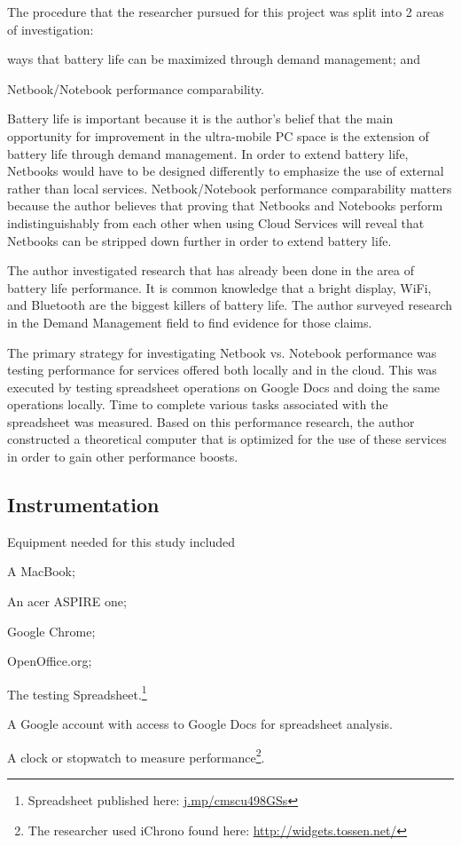 The procedure that the researcher pursued for this project was split into 2 areas
of investigation:
\begin{inparaenum}[(1)]
\item ways that battery life can be maximized through demand management; and
\item Netbook/Notebook performance comparability.
\end{inparaenum}
Battery life is important because it is the author's belief that the main
opportunity for improvement in the ultra-mobile PC space is the extension of
battery life through demand management.  In order to extend battery life,
Netbooks would have to be designed differently to emphasize the use of external
rather than local services.  Netbook/Notebook performance comparability matters
because the author believes that proving that Netbooks and Notebooks perform
indistinguishably from each other when using Cloud Services will reveal that
Netbooks can be stripped down further in order to extend battery life.

The author investigated research that has already been done in the area of
battery life performance.  It is common knowledge that a bright display, WiFi,
and Bluetooth are the biggest killers of battery life.  The author surveyed
research in the Demand Management field to find evidence for those claims.

The primary strategy for investigating Netbook vs. Notebook performance was
testing performance for services offered both locally and in the cloud.  This
was executed by testing spreadsheet operations on Google Docs and doing the same
operations locally.  Time to complete various tasks associated with the
spreadsheet was measured.  Based on this performance research, the author
constructed a theoretical computer that is optimized for the use of these
services in order to gain other performance boosts.

\subsection{Instrumentation}

Equipment needed for this study included
\begin{inparaenum}[(1)]
\item A MacBook;
\item An acer ASPIRE one;
\item Google Chrome;
\item OpenOffice.org;
\item The testing Spreadsheet.\footnote{Spreadsheet published here:
  \url{j.mp/cmscu498GSs}}
\item A Google account with access to Google Docs for spreadsheet analysis.
\item A clock or stopwatch to measure performance\footnote{The researcher used
  iChrono found here: \url{http://widgets.tossen.net/}}.
\end{inparaenum}

